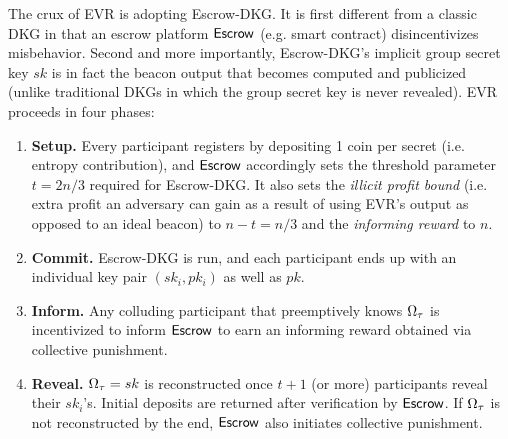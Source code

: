
The crux of EVR is adopting Escrow-DKG. It is first different from a classic DKG in that an escrow platform $\mathsf{Escrow}$ (e.g. smart contract) disincentivizes misbehavior. Second and more importantly, Escrow-DKG's implicit group secret key $sk$ is in fact the beacon output that becomes computed and publicized (unlike traditional DKGs in which the group secret key is never revealed). EVR proceeds in four phases:
\begin{enumerate}
    \item \textbf{Setup.} Every participant registers by depositing 1 coin per secret (i.e. entropy contribution), and $\mathsf{Escrow}$ accordingly sets the threshold parameter $t = 2n / 3$ required for Escrow-DKG. It also sets the \textit{illicit profit bound} (i.e. extra profit an adversary can gain as a result of using EVR's output as opposed to an ideal beacon) to $n - t = n / 3$ and the \textit{informing reward} to $n$.
    \item \textbf{Commit.} Escrow-DKG is run, and each participant ends up with an individual key pair $(sk_i, pk_i)$ as well as $pk$.
    \item \textbf{Inform.} Any colluding participant that preemptively knows $\Omega_\tau$ is incentivized to inform $\mathsf{Escrow}$ to earn an informing reward obtained via collective punishment. %
    \item \textbf{Reveal.} $\Omega_\tau = sk$ is reconstructed once $t + 1$ (or more) participants reveal their $sk_i$'s. Initial deposits are returned after verification by $\mathsf{Escrow}$. If $\Omega_\tau$ is not reconstructed by the end, $\mathsf{Escrow}$ also initiates collective punishment.
\end{enumerate}

